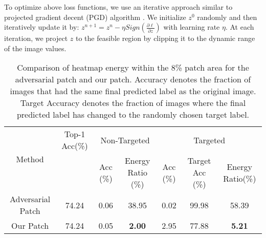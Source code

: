 \documentclass[10pt,twocolumn,letterpaper]{article}
\begin{document}
To optimize above loss functions, we use an iterative approach similar to  projected gradient decent (PGD) algorithm \cite{madry2017towards}. We initialize $z^0$ randomly and then iteratively update it by: $\displaystyle z^{n+1} = z^n - \eta Sign({\frac{\partial \ell}{\partial z}})$ with learning rate $\eta$. At each iteration, we project $z$ to the feasible region by clipping it to the dynamic range of the image values.
\begin{table*}[!t]
\centering
 \begin{tabular}{||c || c | c | c | c | c | c ||}
 \hline
 \multirow{2}{*}{Method} & Top-1 Acc(\%) & \multicolumn{2}{|c|}{Non-Targeted} & \multicolumn{3}{|c|}{Targeted} \\ [0.5ex]
 \cline{3-7}
 & & Acc (\%) & Energy Ratio (\%) & Acc (\%) & Target Acc (\%) & Energy Ratio(\%)\\
 \hline\hline
 Adversarial Patch \cite{brown2017adversarial} & 74.24 & 0.06 & 38.95 & 0.02 & 99.98 & 58.39   \\
 \hline
 Our Patch & 74.24 & 0.05 & \textbf{2.00} & 2.95 &77.88 & \textbf{5.21} \\
 \hline
\end{tabular}
\newline
    \caption{Comparison of heatmap energy within the 8\% patch area for the adversarial patch \cite{brown2017adversarial} and our patch. Accuracy denotes the fraction of images that had the same final predicted label as the original image. Target Accuracy denotes the fraction of images where the final predicted label has changed to the randomly chosen target label. %
    }
    \label{fig:comparison_patch_heatmap}
\end{table*}
\end{document}
